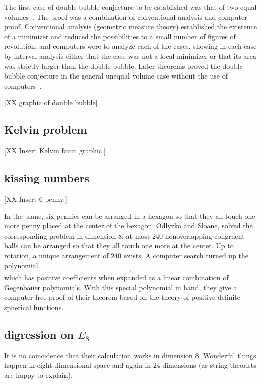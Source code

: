 \documentclass{llncs}
\begin{document}
The first case of double bubble conjecture to be established was that
of two equal volumes~\cite{HHS95}.  The proof was a combination of conventional
analysis and computer proof.  Conventional analysis (geometric measure
theory) established the existence of a minimizer and reduced the
possibilities to a small number of figures of revolution, and
computers were to analyze each of the cases, showing in each case by
interval analysis either that the case was not a local minimizer or
that its area was strictly larger than the double bubble.  Later
theorems proved the double bubble conjecture in the general unequal
volume case without the use of computers~\cite{HMRR}.

[XX graphic of double bubble]


\subsection{Kelvin problem}

[XX Insert Kelvin foam graphic.]



\subsection{kissing numbers} %

[XX Insert 6 penny.]

In the plane, six pennies can be arranged in a hexagon so that they
all touch one more penny placed at the center of the hexagon.  Odlyzko
and Sloane, solved the corresponding problem in dimension $8$: at most
$240$ nonoverlapping congruent balls can be arranged so that they all
touch one more at the center.  Up to rotation, a unique arrangement of
$240$ exists.  A computer search turned up the polynomial
\[
,
\]
which has positive coefficients when expanded as a linear combination
of Gegenbauer polynomials.  With this special polynomial in hand, they
give a computer-free proof of their theorem based on the theory of
positive definite spherical functions.


\subsection{digression on $E_8$}

It is no coincidence that their calculation works in dimension $8$.
Wonderful things happen in eight dimensional space and again in $24$
dimensions (as string theorists are happy to explain).
\end{document}

